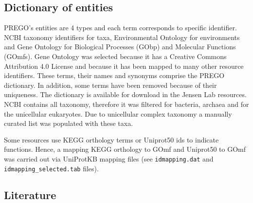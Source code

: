    \subsection{Dictionary of entities}
   \label{subsec:prego-resources}


PREGO's entities are 4 types and each term corresponds to specific identifier. 
NCBI taxonomy identifiers for taxa, Environmental Ontology for environments and
Gene Ontology for Biological Processes (GObp) and Molecular Functions (GOmfs).
Gene Ontology was selected because it has a Creative Commons Attribution 4.0 License
and because it has been mapped to many other resource identifiers.
These terms, their names and synonyms comprise the PREGO dictionary. In addition,
some terms have been removed because of their uniqueness. The dictionary is 
available for download in the Jensen Lab resources. 
NCBI contains all taxonomy, therefore it was filtered for bacteria, archaea and
for the unicellular eukaryotes. Due to unicellular complex taxonomy a manually curated
list was populated with these taxa.

Some resources use KEGG orthology terms or Uniprot50 ids to indicate functions. 
Hence, a mapping KEGG orthology to GOmf and Uniprot50 to GOmf was carried out via UniProtKB mapping files (see \texttt{idmapping.dat} and \texttt{idmapping\_selected.tab} files). 

   \subsection{Literature}
   \label{subsec:prego-tm}

